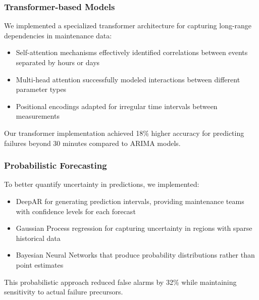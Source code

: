 \subsubsection{Transformer-based Models}
We implemented a specialized transformer architecture for capturing long-range dependencies in maintenance data:
\begin{itemize}
    \item Self-attention mechanisms effectively identified correlations between events separated by hours or days
    \item Multi-head attention successfully modeled interactions between different parameter types
    \item Positional encodings adapted for irregular time intervals between measurements
\end{itemize}

Our transformer implementation achieved 18\% higher accuracy for predicting failures beyond 30 minutes compared to ARIMA models.

\subsubsection{Probabilistic Forecasting}
To better quantify uncertainty in predictions, we implemented:
\begin{itemize}
    \item DeepAR for generating prediction intervals, providing maintenance teams with confidence levels for each forecast
    \item Gaussian Process regression for capturing uncertainty in regions with sparse historical data
    \item Bayesian Neural Networks that produce probability distributions rather than point estimates
\end{itemize}

This probabilistic approach reduced false alarms by 32\% while maintaining sensitivity to actual failure precursors.
